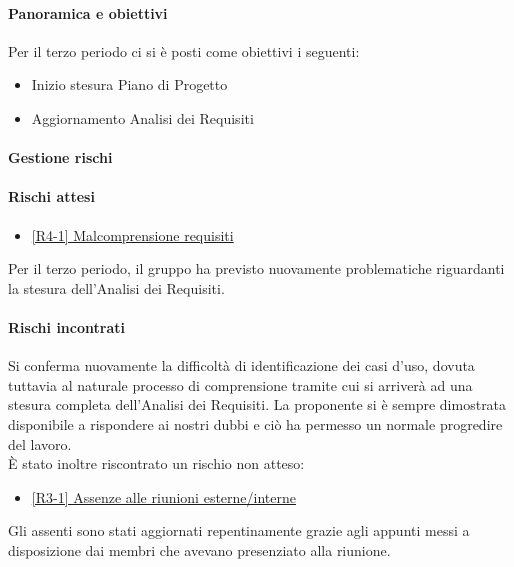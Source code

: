 \documentclass[a4paper,12pt]{article}
\begin{document}
            \paragraph{Panoramica e obiettivi}
            Per il terzo periodo ci si è posti come obiettivi i seguenti:
                \begin{itemize}
                    \item Inizio stesura Piano di Progetto
                    \item Aggiornamento Analisi dei Requisiti
                \end{itemize}
            
            \paragraph{Gestione rischi}
            \paragraph*{Rischi attesi}
                \begin{itemize}
                    \item\hyperref[tab:r4]{[R4-1] Malcomprensione requisiti}
                \end{itemize}
                Per il terzo periodo, il gruppo ha previsto nuovamente problematiche riguardanti la stesura dell'Analisi dei Requisiti.

            \paragraph*{Rischi incontrati}
            Si conferma nuovamente la difficoltà di identificazione dei casi d'uso, dovuta tuttavia al naturale processo di comprensione tramite cui si arriverà ad una stesura completa dell'Analisi dei Requisiti. La proponente si è sempre dimostrata disponibile a rispondere ai nostri dubbi e ciò ha permesso un normale progredire del lavoro.
            \\ È stato inoltre riscontrato un rischio non atteso:
            \begin{itemize}
                \item \hyperref[tab:r3]{[R3-1] Assenze alle riunioni esterne/interne}
            \end{itemize}
            Gli assenti sono stati aggiornati repentinamente grazie agli appunti messi a disposizione dai membri che avevano presenziato alla riunione.
            
\end{document}
